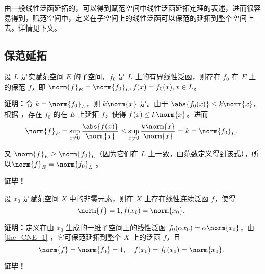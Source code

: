 

由一般线性泛函延拓的，可以得到赋范空间中线性泛函延拓定理的表述，进而很容易得到，赋范空间中，定义在子空间上的线性泛函可以保范的延拓到整个空间上去。详情见下文。

\subsection{保范延拓}

\begin{theorem}{}\label{the_CNE_1}
设 $L$ 是实赋范空间 $E$ 的子空间，$f_0$ 是 $L$ 上的有界线性泛函，则存在 $f_0$ 在 $E$ 上的保范 $f$，即 $\norm{f}_{E}=\norm{f_0}_{L},f(x)=f_0(x),x\in L$。
\end{theorem}

\textbf{证明：}令 $k=\norm{f_0}_{L}$，则 $k\norm{x}$ 是。由于 $\abs{f_0(x)}\leq k\norm{x}$，根据 ，存在 $f_0$ 的在 $E$ 上延拓 $f$，使得 $f(x)\leq k\norm{x}$。进而
\begin{equation}
\norm{f}_E=\sup_{x\neq0}\frac{\abs{f(x)}}{\norm{x}}\leq\sup_{x\neq0}\frac{k\norm{x}}{\norm{x}}=k=\norm{f_0}_L.~
\end{equation}
 
又 $\norm{f}_E\geq \norm{f_0}_L$（因为它们在 $L$ 上一致，由范数定义得到该式），所以$\norm{f}_{E}=\norm{f_0}_{L}$ 。

\textbf{证毕！}


\begin{corollary}{}
设 $x_0$ 是赋范空间 $X$ 中的非零元素，则在 $X$ 上存在线性连续泛函 $f$，使得
\begin{equation}
\norm{f}=1,f(x_0)=\norm{x_0}.~
\end{equation}

\end{corollary}

\textbf{证明：}定义在由  $x_0$ 生成的一维子空间上的线性泛函 $f_0(\alpha x_0)=\alpha\norm{x_0}$，由\autoref{the_CNE_1} ，它可保范延拓到整个 $X$ 上的泛函 $f$，且 
\begin{equation}
\norm{f}=\norm{f_0}=1,\quad f(x_0)=f_0(x_0)=\norm{x_0}.~
\end{equation}


\textbf{证毕！}

